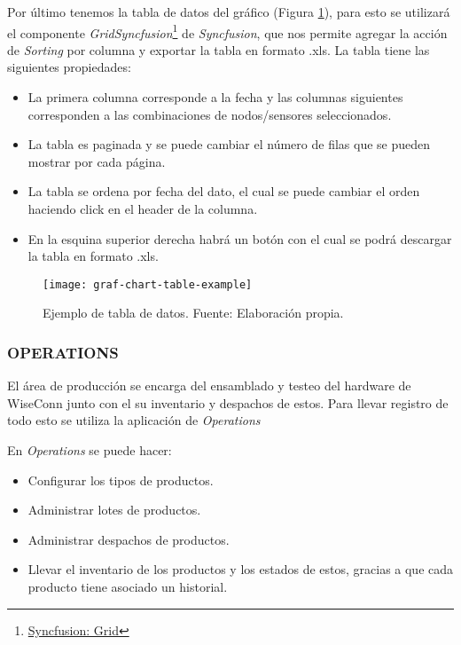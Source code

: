 Por último tenemos la tabla de datos del gráfico (Figura \ref{fig:graf-chart-table-example}), para esto se utilizará el componente \textit{Grid}\textit{Syncfusion}\footnote{\href{https://ej2.syncfusion.com/react/documentation/grid/getting-started}{Syncfusion: Grid}} de \textit{Syncfusion}, que nos permite agregar la acción de \textit{Sorting} por columna y exportar la tabla en formato .xls.
La tabla tiene las siguientes propiedades:
\begin{itemize}
    \item La primera columna corresponde a la fecha y las columnas siguientes corresponden a las combinaciones de nodos/sensores seleccionados.
    \item La tabla es paginada y se puede cambiar el número de filas que se pueden mostrar por cada página.
    \item La tabla se ordena por fecha del dato, el cual se puede cambiar el orden haciendo click en el header de la columna.
    \item En la esquina superior derecha habrá un botón con el cual se podrá descargar la tabla en formato .xls.
\end{itemize}

\begin{figure}[H]
	\centering
	\texttt{[image: graf-chart-table-example]}
	\caption{\label{fig:graf-chart-table-example} Ejemplo de tabla de datos. Fuente: Elaboración propia.}
\end{figure}

\subsubsection{OPERATIONS}

El área de producción se encarga del ensamblado y testeo del hardware de WiseConn junto con el su inventario y despachos de estos. Para llevar registro de todo esto se utiliza la aplicación de \textit{Operations}

En \textit{Operations} se puede hacer:

\begin{itemize}
    \item Configurar los tipos de productos.
    \item Administrar lotes de productos.
    \item Administrar despachos de productos.
    \item Llevar el inventario de los productos y los estados de estos, gracias a que cada producto tiene asociado un historial.
\end{itemize}

